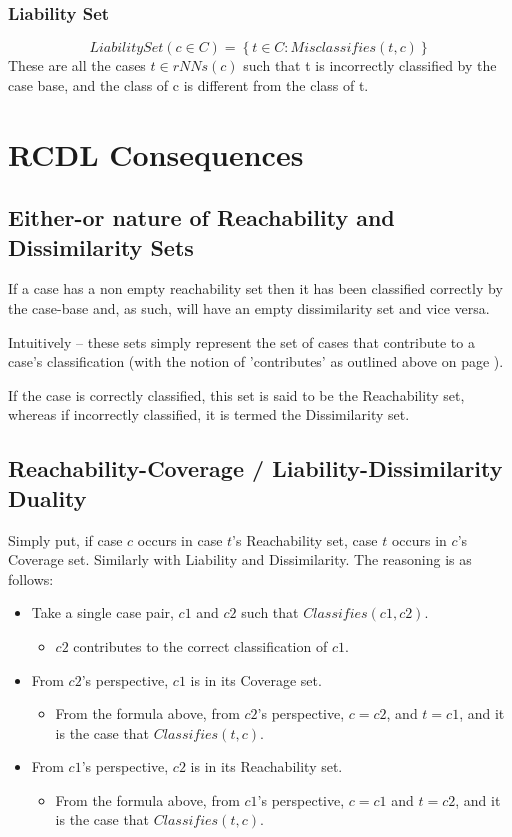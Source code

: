 \documentclass[a4paper,11pt]{report}
\begin{document}
\subsubsection{Liability Set}
\[ LiabilitySet(c \in C) = \left\lbrace t \in C : Misclassifies(t, c) \right\rbrace \]  
These are all the cases $ t \in rNNs(c) $ such that t is incorrectly classified by the case base, and the class of c is different from the class of t.

\section{RCDL Consequences}

\subsection{Either-or nature of Reachability and Dissimilarity Sets}
If a case has a non empty reachability set then it has been classified correctly by the case-base and, as such, will have an empty dissimilarity set and vice versa.

Intuitively – these sets simply represent the set of cases that contribute to a case's classification (with the notion of 'contributes' as outlined above on page \pageref{sec:contributes}). 

If the case is correctly classified, this set is said to be the Reachability set, whereas if incorrectly classified, it is termed the Dissimilarity set.

\subsection{Reachability-Coverage / Liability-Dissimilarity Duality}
Simply put, if case $c$ occurs in case $t$'s Reachability set, case $t$ occurs in $c$'s Coverage set. Similarly with Liability and Dissimilarity.
The reasoning is as follows:
\begin{itemize}
	\item Take a single case pair, $c1$ and $c2$ such that $Classifies(c1, c2)$.
	\begin{itemize}
		\item $c2$ contributes to the correct classification of $c1$.
	\end{itemize}
	\item From $c2$'s perspective, $c1$ is in its Coverage set.
	\begin{itemize}
		\item From the formula above, from $c2$'s perspective, $c=c2$, and $t=c1$, and it is the case that $Classifies(t, c)$.
	\end{itemize}
	\item From $c1$'s perspective, $c2$ is in its Reachability set.
	\begin{itemize}
		\item From the formula above, from $c1$'s perspective, $c=c1$ and $t=c2$, and it is the case that $Classifies(t, c)$.
	\end{itemize}
\end{itemize}
\end{document}
